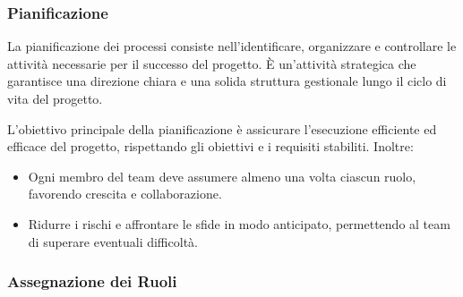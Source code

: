 \subsubsection{Pianificazione}

La pianificazione dei processi consiste nell'identificare, organizzare e controllare le attività necessarie per il successo del progetto. È un'attività strategica che garantisce una direzione chiara e una solida struttura gestionale lungo il ciclo di vita del progetto.

L’obiettivo principale della pianificazione è assicurare l'esecuzione efficiente ed efficace del progetto, rispettando gli obiettivi e i requisiti stabiliti. Inoltre:
\begin{itemize}
    \item Ogni membro del team deve assumere almeno una volta ciascun ruolo, favorendo crescita e collaborazione.
    \item Ridurre i rischi e affrontare le sfide in modo anticipato, permettendo al team di superare eventuali difficoltà.
\end{itemize}

\subsubsection{Assegnazione dei Ruoli}

